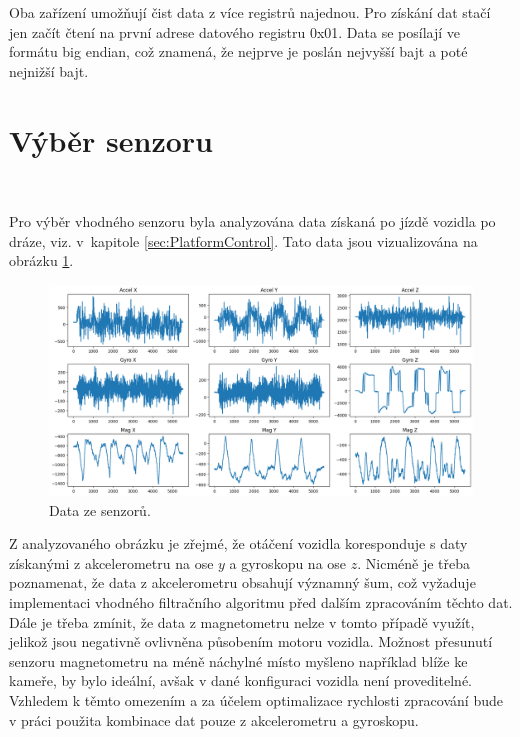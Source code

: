 Oba zařízení umožňují čist data z více registrů najednou. Pro získání dat stačí jen
začít čtení na první adrese datového registru 0x01. Data se posílají ve formátu big
endian, což znamená, že nejprve je poslán nejvyšší bajt a poté nejnižší bajt.

\section{Výběr senzoru}\

Pro výběr vhodného senzoru byla analyzována data získaná po jízdě vozidla po dráze,
viz. v~kapitole \ref{sec:PlatformControl}. Tato data jsou vizualizována na obrázku
\ref{fig:Sensors}.
\begin{figure}[!h]
    \centering
    \includegraphics[width = .9\linewidth]{Figures/Sensors.png}
    \caption{Data ze senzorů.}
    \label{fig:Sensors}
\end{figure}

Z analyzovaného obrázku je zřejmé, že otáčení vozidla koresponduje s daty získanými
z akcelerometru na ose $y$ a gyroskopu na ose $z$. Nicméně je třeba poznamenat, že
data z akcelerometru obsahují významný šum, což vyžaduje implementaci vhodného
filtračního algoritmu před dalším zpracováním těchto dat. Dále je třeba zmínit, že
data z magnetometru nelze v tomto případě využít, jelikož jsou negativně ovlivněna
působením motoru vozidla. Možnost přesunutí senzoru magnetometru na méně náchylné
místo myšleno například blíže ke kameře, by bylo ideální, avšak v dané konfiguraci
vozidla není proveditelné. Vzhledem k těmto omezením a za účelem optimalizace
rychlosti zpracování bude v práci použita kombinace dat pouze z akcelerometru a
gyroskopu.

\endinput
